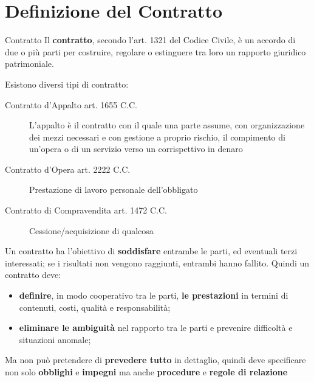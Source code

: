 \section{Definizione del Contratto}\label{sec:cv_definizione_del_contratto} %
\begin{definition}{Contratto}{}
    Il \textbf{contratto}, secondo l'art. 1321 del Codice Civile, è un accordo di due o più parti per costruire, regolare o estinguere tra loro un rapporto giuridico patrimoniale.
\end{definition}
Esistono diversi tipi di contratto:
\begin{description}
    \item[Contratto d'Appalto art. 1655 C.C.] L'appalto è il contratto con il quale una parte assume, con organizzazione dei mezzi necessari e con gestione a proprio rischio, il compimento di un'opera o di un servizio verso un corrispettivo in denaro
    \item[Contratto d'Opera art. 2222 C.C.] Prestazione di lavoro personale dell'obbligato
    \item[Contratto di Compravendita art. 1472 C.C.] Cessione/acquisizione di qualcosa
\end{description}
\begin{note}
    Un contratto ha l'obiettivo di \textbf{soddisfare} entrambe le parti, ed eventuali terzi interessati; se i risultati non vengono raggiunti, entrambi hanno fallito.
    Quindi un contratto deve:
    \begin{itemize}
        \item \textbf{definire}, in modo cooperativo tra le parti, \textbf{le prestazioni} in termini di contenuti, costi, qualità e responsabilità;
        \item \textbf{eliminare le ambiguità} nel rapporto tra le parti e prevenire difficoltà e situazioni anomale;
    \end{itemize}
    \begin{warning}
        Ma non può pretendere di \textbf{prevedere tutto} in dettaglio, quindi deve specificare non solo \textbf{obblighi} e \textbf{impegni} ma anche \textbf{procedure} e \textbf{regole di relazione}
    \end{warning}
\end{note}
%
